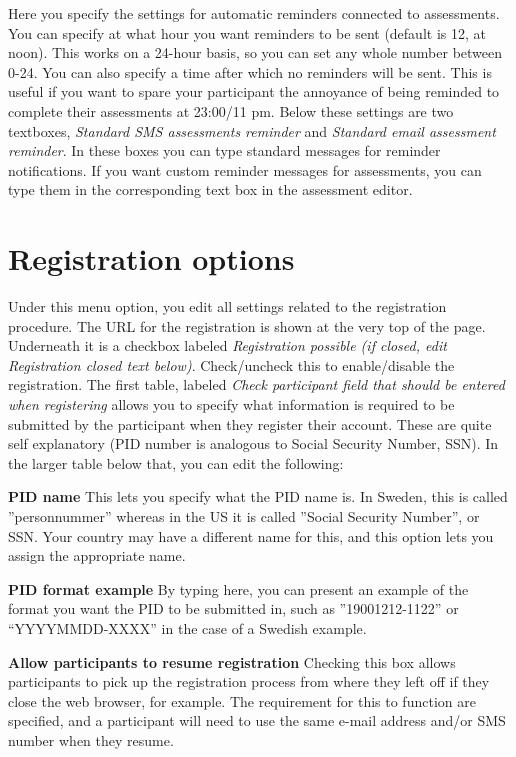 \documentclass[]{book}
\begin{document}
Here you specify the settings for automatic reminders connected to assessments. You can specify at what hour you want reminders to be sent (default is 12, at noon). This works on a 24-hour basis, so you can set any whole number between 0-24.
You can also specify a time after which no reminders will be sent. This is useful if you want to spare your participant the annoyance of being reminded to complete their assessments at 23:00/11 pm.
Below these settings are two textboxes, \emph{Standard SMS assessments reminder} and \emph{Standard email assessment reminder}. In these boxes you can type standard messages for reminder notifications. If you want custom reminder messages for assessments, you can type them in the corresponding text box in the assessment editor.

\hypertarget{registration-options}{%
\chapter{Registration options}\label{registration-options}}

Under this menu option, you edit all settings related to the registration procedure. The URL for the registration is shown at the very top of the page. Underneath it is a checkbox labeled \emph{Registration possible (if closed, edit Registration closed text below)}. Check/uncheck this to enable/disable the registration.
The first table, labeled \emph{Check participant field that should be entered when registering} allows you to specify what information is required to be submitted by the participant when they register their account. These are quite self explanatory (PID number is analogous to Social Security Number, SSN).
In the larger table below that, you can edit the following:

\textbf{PID name}
This lets you specify what the PID name is. In Sweden, this is called ''personnummer'' whereas in the US it is called ''Social Security Number'', or SSN. Your country may have a different name for this, and this option lets you assign the appropriate name.

\textbf{PID format example}
By typing here, you can present an example of the format you want the PID to be submitted in, such as ''19001212-1122'' or ``YYYYMMDD-XXXX'' in the case of a Swedish example.

\textbf{Allow participants to resume registration}
Checking this box allows participants to pick up the registration process from where they left off if they close the web browser, for example. The requirement for this to function are specified, and a participant will need to use the same e-mail address and/or SMS number when they resume.
\end{document}
